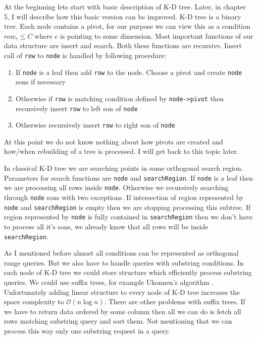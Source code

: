 \documentclass[10pt,a4paper]{article}
\newcommand{\Oh}{\mathcal{O}}
\begin{document}
At the beginning lets start with basic description of K-D tree. Later, in chapter 5, I will describe how this basic version can be improved. K-D tree is a binary tree. Each node contains a pivot, for our purpose we can view this as a condition $row_{e} \leq C$ where $e$ is pointing to some dimension. Most important functions of our data structure are insert and search. Both these functions are recursive. Insert call of \verb|row| to \verb|node| is handled by following procedure: 

\begin{enumerate}
\item If \verb|node| is a leaf then add \verb|row| to the node. Choose a pivot and create \verb|node| sons if necessary
\item Otherwise if \verb|row| is matching condition defined by \verb|node->pivot| then recursively insert \verb|row| to left son of \verb|node|
\item Otherwise recursively insert \verb|row| to right son of \verb|node|
\end{enumerate}

At this point we do not know nothing about how pivots are created and how/when rebuilding of a tree is processed. I will get back to this topic later.

In classical K-D tree we are searching points in some orthogonal search region. Parameters for search functions are \verb|node| and \verb|searchRegion|. If \verb|node| is a leaf then we are processing all rows inside \verb|node|. Otherwise we recursively searching through \verb|node| sons with two exceptions. If intersection of region represented by \verb|node| and \verb|searchRegion| is empty then we are stopping processing this subtree. If region represented by \verb|node| is fully contained in \verb|searchRegion| then we don't have to process all it's sons, we already know that all rows will be inside \verb|searchRegion|.

As I mentioned before almost all conditions can be represented as orthogonal range queries. But we also have to handle queries with substring conditions. In each node of K-D tree we could store structure which efficiently process substring queries. We could use suffix trees, for example Ukonnen's algorithm \cite{STUKK}. Unfortunately adding linear structure to every node of K-D tree increases the space complexity to $\Oh(n \log n)$. There are other problems with suffix trees. If we have to return data ordered by some column then all we can do is fetch all rows matching substring query and sort them. Not mentioning that we can process this way only one substring request in a query.
\end{document}
